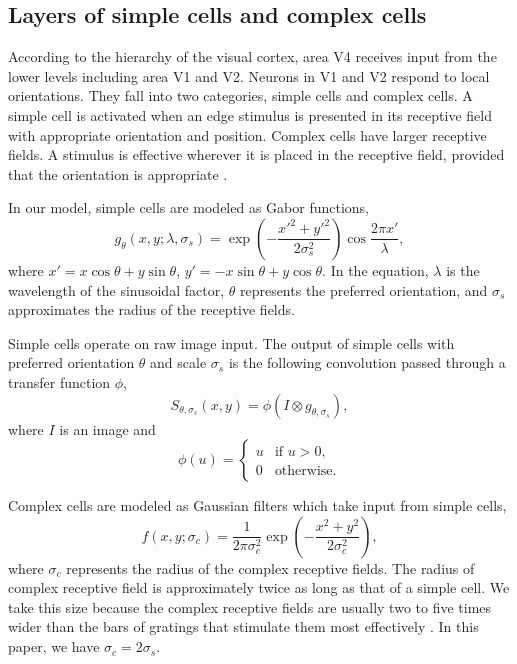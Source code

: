\documentclass[twocolumn]{article}
\begin{document}
\subsection{Layers of simple cells and complex cells}

According to the hierarchy of the visual cortex, area V4 receives input from the lower levels including area V1 and V2.
Neurons in V1 and V2 respond to local orientations.
They fall into two categories, simple cells and complex cells.
A simple cell is activated when an edge stimulus is presented in its receptive field with appropriate orientation and position.
Complex cells have larger receptive fields.
A stimulus is effective wherever it is placed in the receptive field, provided that the orientation is appropriate \cite{hubel1962}.

In our model, simple cells are modeled as Gabor functions,
\begin{equation}\label{equ:gabor}
g_{\theta}(x,y;\lambda,\sigma_s)
=\exp \left(-\frac{x'^2+y'^2}{2\sigma_s^2}\right)
\cos\frac{2\pi x'}{\lambda},
\end{equation}
where $x'=x\cos\theta+y\sin\theta$, $y'=-x\sin\theta+y\cos\theta$.
In the equation, $\lambda$ is the wavelength of the sinusoidal factor, 
$\theta$ represents the preferred orientation,
and $\sigma_s$ approximates the radius of the receptive fields.

Simple cells operate on raw image input. 
The output of simple cells with preferred orientation $\theta$ and scale $\sigma_s$ is the following convolution passed through a transfer function $\phi$,
\begin{equation}\label{equ:gabor}
S_{\theta,\sigma_s}(x,y)=\phi(I\otimes g_{\theta,\sigma_s}),
\end{equation}
where $I$ is an image and 
\begin{equation}\label{equ:gabor}
\phi(u)=\left\{\begin{array}{ll}
u & \text{if } u>0,\\
0 & \text{otherwise.}
\end{array}\right.
\end{equation}

Complex cells are modeled as Gaussian filters which take input from simple cells,
\begin{equation}
f(x,y;\sigma_c)=\frac{1}{2\pi\sigma_c^2}\exp\left(-\frac{x^2+y^2}{2\sigma_c^2}\right),
\end{equation}
where $\sigma_c$ represents the radius of the complex receptive fields.
The radius of complex receptive field is approximately twice as long as that of a simple cell.
We take this size because the complex receptive fields are usually two to five times wider 
than the bars of gratings that stimulate them most effectively \cite{hubel1962}.
In this paper, we have $\sigma_c=2\sigma_s$.
\end{document}
